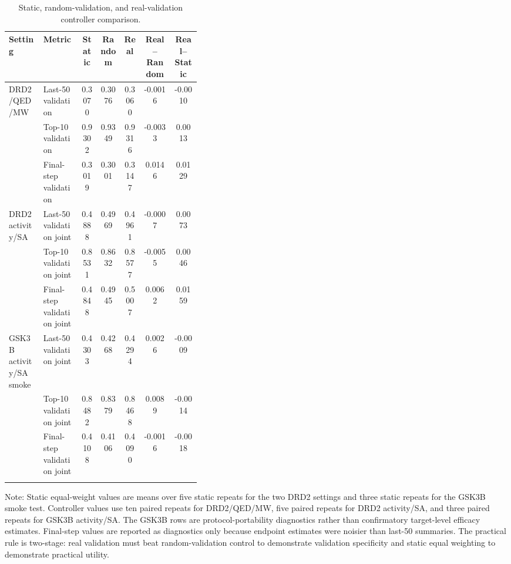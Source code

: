 \documentclass[referee,lineno,pdflatex,sn-basic]{sn-jnl}
\theoremstyle{thmstyleone}%
\theoremstyle{thmstyletwo}%
\theoremstyle{thmstylethree}%
\begin{document}
\begin{table}[h]
\caption{Static, random-validation, and real-validation controller comparison.}
\label{tab:static_random_real}
\centering
\footnotesize
\setlength{\tabcolsep}{3pt}
\begin{tabularx}{\linewidth}{@{}p{0.18\linewidth}p{0.20\linewidth}ccccc@{}}
\toprule
Setting & Metric & Static & Random & Real & Real--Random & Real--Static\\
\midrule
DRD2/QED/MW & Last-50 validation & 0.3070 & 0.3076 & 0.3060 & -0.0016 & -0.0010\\
 & Top-10 validation & 0.9302 & 0.9349 & 0.9316 & -0.0033 & 0.0013\\
 & Final-step validation & 0.3019 & 0.3001 & 0.3147 & 0.0146 & 0.0129\\
\addlinespace
DRD2 activity/SA & Last-50 validation joint & 0.4888 & 0.4969 & 0.4961 & -0.0007 & 0.0073\\
 & Top-10 validation joint & 0.8531 & 0.8632 & 0.8577 & -0.0055 & 0.0046\\
 & Final-step validation joint & 0.4848 & 0.4945 & 0.5007 & 0.0062 & 0.0159\\
\addlinespace
GSK3B activity/SA smoke & Last-50 validation joint & 0.4303 & 0.4268 & 0.4294 & 0.0026 & -0.0009\\
 & Top-10 validation joint & 0.8482 & 0.8379 & 0.8468 & 0.0089 & -0.0014\\
 & Final-step validation joint & 0.4108 & 0.4106 & 0.4090 & -0.0016 & -0.0018\\
\botrule
\end{tabularx}
\vspace{2pt}
\raggedright
\footnotesize
Note: Static equal-weight values are means over five static repeats for the two DRD2 settings and three static repeats for the GSK3B smoke test. Controller values use ten paired repeats for DRD2/QED/MW, five paired repeats for DRD2 activity/SA, and three paired repeats for GSK3B activity/SA. The GSK3B rows are protocol-portability diagnostics rather than confirmatory target-level efficacy estimates. Final-step values are reported as diagnostics only because endpoint estimates were noisier than last-50 summaries. The practical rule is two-stage: real validation must beat random-validation control to demonstrate validation specificity and static equal weighting to demonstrate practical utility.
\end{table}
\end{document}
